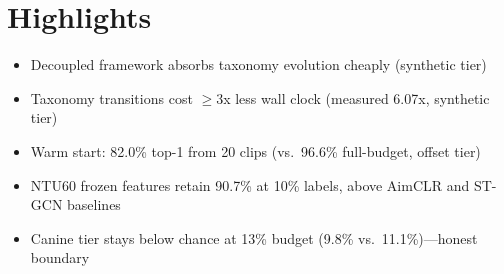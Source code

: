 \documentclass{article}
\begin{document}
\section*{Highlights}
\begin{itemize}
\item Decoupled framework absorbs taxonomy evolution cheaply (synthetic tier)
\item Taxonomy transitions cost $\geq$3x less wall clock (measured 6.07x, synthetic tier)
\item Warm start: 82.0\% top-1 from 20 clips (vs.\ 96.6\% full-budget, offset tier)
\item NTU60 frozen features retain 90.7\% at 10\% labels, above AimCLR and ST-GCN baselines
\item Canine tier stays below chance at 13\% budget (9.8\% vs.\ 11.1\%)---honest boundary
\end{itemize}
\end{document}

